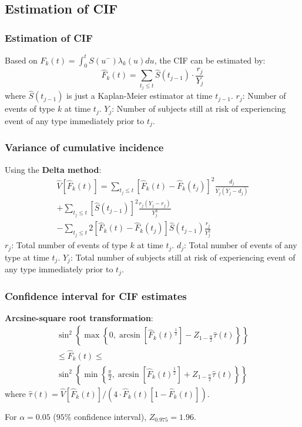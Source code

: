 \documentclass[11pt, aspectratio = 169]{beamer}
\begin{document}
\subsection{Estimation of CIF}

\begin{frame}
  \frametitle{Estimation of CIF}
  Based on $F_k(t) = \int_0^t S(u^-)\lambda_k(u)du$, the CIF can be estimated by\footnotemark:
  \begin{equation*}
    \hat{F}_k(t) = \sum_{t_j \le t}\hat{S}(t_{j-1}) \cdot \frac{r_j}{Y_j}
  \end{equation*}
  where $\hat{S}(t_{j-1})$ is just a Kaplan-Meier estimator at time $t_{j-1}$.
  $r_j$: Number of events of type $k$ at time $t_j$.
  $Y_j$: Number of subjects still at risk of experiencing event of any type immediately prior to $t_j$.
\end{frame}

\begin{frame}
  \frametitle{Variance of cumulative incidence}
  Using the \textbf{Delta method}\footnotemark:
  \begin{multline*}
    \hat{V}\left[\hat{F}_k(t)\right] = \sum_{t_j \le t}\left[\hat{F}_k(t) - \hat{F}_k\left(t_j\right)\right]^2 \frac{d_j}{Y_j\left(Y_j - d_j\right)} \\
    + \sum_{t_j \le t}\left[\hat{S}\left(t_{j-1}\right)\right]^2 \frac{r_j\left(Y_j - r_j\right)}{Y_j^3} \\
    - \sum_{t_j \le t}2\left[\hat{F}_k(t) - \hat{F}_k\left(t_j\right)\right] \hat{S}\left(t_{j-1}\right) \frac{r_j}{Y_j^2}
  \end{multline*}
  $r_j$: Total number of events of type $k$ at time $t_j$.
  $d_j$: Total number of events of any type at time $t_j$.
  $Y_j$: Total number of subjects still at risk of experiencing event of any type immediately prior to $t_j$.
\end{frame}  

\begin{frame}
  \frametitle{Confidence interval for CIF estimates}
  \textbf{Arcsine-square root transformation}:
  \begin{multline*}
    \sin^2\left\{\max\left\{0, \arcsin\left[\hat{F}_k(t)^{\frac{1}{2}}\right] - Z_{1 - \frac{\alpha}{2}}\hat{\tau}(t)\right\}\right\} \\
    \le \hat{F}_k(t) \le \\
    \sin^2\left\{\min\left\{\frac{\pi}{2}, \arcsin\left[\hat{F}_k(t)^{\frac{1}{2}}\right] + Z_{1 - \frac{\alpha}{2}}\hat{\tau}(t)\right\}\right\}    
  \end{multline*}
  where $\hat{\tau}(t) = \hat{V}\left[\hat{F}_k(t)\right] / \left(4 \cdot \hat{F}_k(t)\left[1 - \hat{F}_k(t)\right]\right)$.

  For $\alpha = 0.05$ ($95\%$ confidence interval),  $Z_{0.975} = 1.96$.
\end{frame}
\end{document}
